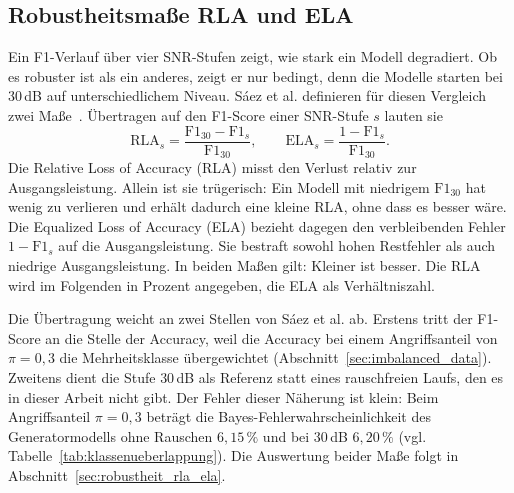 \subsection{Robustheitsmaße RLA und ELA}
\label{sec:robustheitsmetriken}

Ein F1-Verlauf über vier SNR-Stufen zeigt, wie stark ein Modell degradiert. Ob es robuster ist als ein anderes, zeigt er nur bedingt, denn die Modelle starten bei 30\,dB auf unterschiedlichem Niveau. Sáez et al. definieren für diesen Vergleich zwei Maße~\autocite{saezEvaluatingClassifierBehavior2016}. Übertragen auf den F1-Score einer SNR-Stufe $s$ lauten sie
\begin{equation}
	\mathrm{RLA}_{s}=\frac{\mathrm{F1}_{30}-\mathrm{F1}_{s}}{\mathrm{F1}_{30}},\qquad
	\mathrm{ELA}_{s}=\frac{1-\mathrm{F1}_{s}}{\mathrm{F1}_{30}} .
\end{equation}
Die Relative Loss of Accuracy (RLA) misst den Verlust relativ zur Ausgangsleistung. Allein ist sie trügerisch: Ein Modell mit niedrigem $\mathrm{F1}_{30}$ hat wenig zu verlieren und erhält dadurch eine kleine RLA, ohne dass es besser wäre. Die Equalized Loss of Accuracy (ELA) bezieht dagegen den verbleibenden Fehler $1-\mathrm{F1}_s$ auf die Ausgangsleistung. Sie bestraft sowohl hohen Restfehler als auch niedrige Ausgangsleistung. In beiden Maßen gilt: Kleiner ist besser. Die RLA wird im Folgenden in Prozent angegeben, die ELA als Verhältniszahl.

Die Übertragung weicht an zwei Stellen von Sáez et al. ab. Erstens tritt der F1-Score an die Stelle der Accuracy, weil die Accuracy bei einem Angriffsanteil von $\pi=0{,}3$ die Mehrheitsklasse übergewichtet (Abschnitt~\ref{sec:imbalanced_data}). Zweitens dient die Stufe $30$\,dB als Referenz statt eines rauschfreien Laufs, den es in dieser Arbeit nicht gibt. Der Fehler dieser Näherung ist klein: Beim Angriffsanteil $\pi=0{,}3$ beträgt die Bayes-Fehlerwahrscheinlichkeit des Generatormodells ohne Rauschen $6{,}15\,\%$ und bei $30$\,dB $6{,}20\,\%$ (vgl. Tabelle~\ref{tab:klassenueberlappung}). Die Auswertung beider Maße folgt in Abschnitt~\ref{sec:robustheit_rla_ela}.
